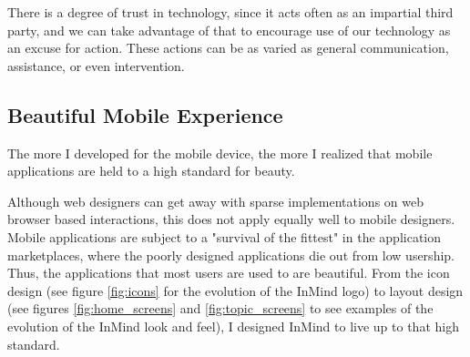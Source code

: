     There is a degree of trust in technology, since it acts often as an impartial third party,
    and we can take advantage of that to encourage use of our technology as an excuse for action.
    These actions can be as varied as 
    general communication,
    assistance, or even intervention.

    \subsection{Beautiful Mobile Experience}
    The more I developed for the mobile device,
    the more I realized that mobile applications are held to a high standard for beauty.

    Although web designers can get away with sparse implementations on web browser based
    interactions,
    this does not apply equally well to mobile designers.
    Mobile applications are subject to a "survival of the fittest" in the application
    marketplaces, where the poorly designed applications die out from low usership.
    Thus, the applications that most users are used to are beautiful.
    From the icon design (see figure \ref{fig:icons} for the evolution of the InMind logo)
    to layout design (see figures \ref{fig:home_screens} and \ref{fig:topic_screens}
    to see examples of the evolution of the InMind look and feel),
    I designed InMind to live up to that high standard.

